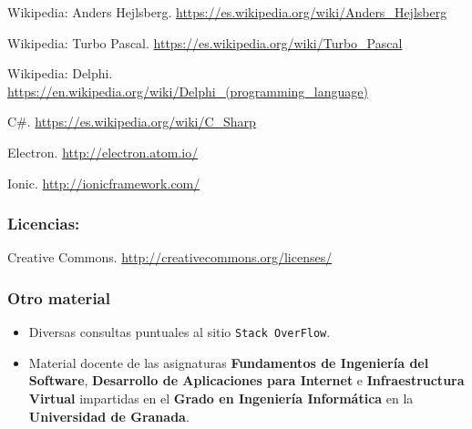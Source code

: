  Wikipedia: Anders Hejlsberg. \url{https://es.wikipedia.org/wiki/Anders_Hejlsberg}

 Wikipedia: Turbo Pascal. \url{https://es.wikipedia.org/wiki/Turbo_Pascal}

 Wikipedia: Delphi. \url{https://en.wikipedia.org/wiki/Delphi_(programming_language)}

 C\#. \url{https://es.wikipedia.org/wiki/C_Sharp}

 Electron. \url{http://electron.atom.io/}

 Ionic. \url{http://ionicframework.com/}
\subsubsection*{Licencias:}

 Creative Commons. \url{http://creativecommons.org/licenses/}


\subsubsection*{Otro material}
\begin{itemize}
	\item Diversas consultas puntuales al sitio {\tt Stack OverFlow}.
	\item Material docente de las asignaturas \textbf{Fundamentos de Ingeniería del Software}, \textbf{Desarrollo de Aplicaciones para Internet} e \textbf{Infraestructura Virtual} impartidas en el \textbf{Grado en Ingeniería Informática} en la \textbf{Universidad de Granada}.
\end{itemize}
